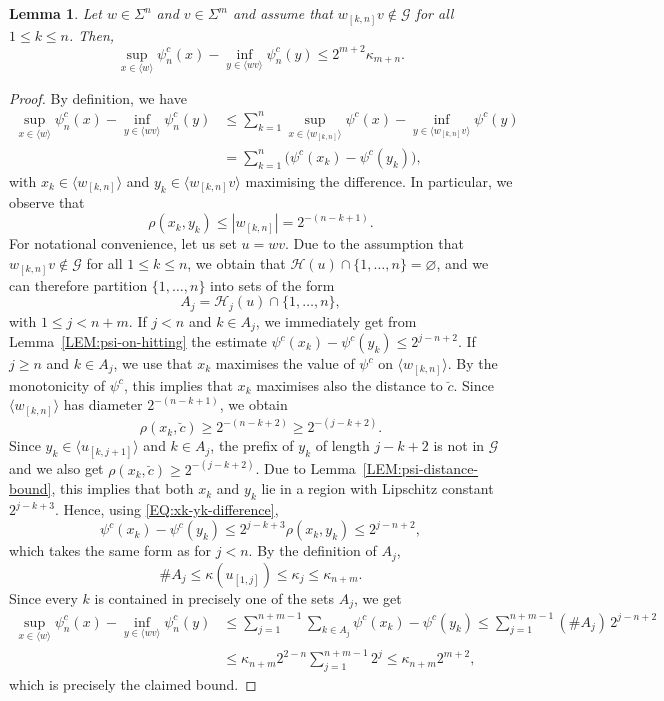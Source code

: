 \documentclass[11pt,reqno]{amsart}
\theoremstyle{plain}
\newtheorem{lemma}[theorem]{Lemma}
\theoremstyle{definition}
\newcommand{\mc}{\mathcal}
\renewcommand{\emptyset}{\varnothing}
\begin{document}
\begin{lemma}
\label{LEM:inf-sup-relation}
Let $w \in \Sigma^n$ and $v \in \Sigma^m$ and assume that $w_{[k,n]} v \notin \mc G$ for all $1\leqslant k \leqslant n$. Then,
\[
\sup_{x \in \langle w \rangle} \psi^c_n(x) - \inf_{y \in \langle wv\rangle} \psi^c_n(y) \leqslant 2^{m+2} \kappa_{m+n}.
\]
\end{lemma}

\begin{proof}
By definition, we have
\begin{align*}
\sup_{x \in \langle w \rangle} \psi^c_n(x) - \inf_{y \in \langle wv\rangle} \psi^c_n(y)
& \leqslant \sum_{k=1}^n \sup_{x \in \langle w_{[k,n]}\rangle} \psi^c(x) - \inf_{y \in \langle w_{[k,n]} v\rangle} \psi^c(y)
\\& = \sum_{k=1}^n \bigl(\psi^c(x_k) - \psi^c(y_k) \bigr),
\end{align*}
with $x_k \in \langle w_{[k,n]}\rangle$ and $y_k \in \langle w_{[k,n]}v\rangle$ maximising the difference. In particular, we observe that
\begin{equation}
\label{EQ:xk-yk-difference}
\rho(x_k,y_k) \leqslant |w_{[k,n]}| = 2^{-(n-k+1)}.
\end{equation}
For notational convenience, let us set $u = wv$.
Due to the assumption that $w_{[k,n]}v \notin \mc G$ for all $1\leqslant k \leqslant n$, we obtain that $\mc H(u)\cap \{1,\ldots,n\} = \emptyset$, and we can therefore partition $\{1,\ldots,n\}$ into sets of the form
\[
A_j = \mc H_j(u) \cap \{1,\ldots,n\},
\]
with $1\leqslant j < n+m$. If $j < n$ and $k \in A_j$, we immediately get from Lemma~\ref{LEM:psi-on-hitting} the estimate $\psi^c(x_k) - \psi^c(y_k) \leqslant 2^{j-n+2}$.
If $j \geqslant n$ and $k \in A_j$, we use that $x_k$ maximises the value of $\psi^c$ on $\langle w_{[k,n]}\rangle$. By the monotonicity of $\psi^c$, this implies that $x_k$ maximises also the distance to $\breve{c}$. Since $\langle w_{[k,n]}\rangle$ has diameter $2^{-(n-k + 1)}$, we obtain
\[
\rho(x_k,\breve{c}) \geqslant 2^{-(n - k +2)} \geqslant 2^{-(j-k+2)}.
\]
Since $y_k \in \langle u_{[k,j + 1]}\rangle$ and $k \in A_j$, the prefix of $y_k$ of length $j - k+2$
is not in $\mc G$ and we also get $\rho(x_k,\breve{c}) \geqslant 2^{-(j-k+2)} $. Due to Lemma~\ref{LEM:psi-distance-bound}, this implies that both $x_k$ and $y_k$ lie in a region with Lipschitz constant  $2^{j - k + 3}$.
Hence, using \eqref{EQ:xk-yk-difference},
\[
\psi^c(x_k) - \psi^c(y_k)
\leqslant 2^{j - k + 3} \rho(x_k,y_k) \leqslant 2^{j - n + 2},
\]
which takes the same form as for $j<n$.
By the definition of $A_j$,
\[
\# A_j \leqslant \kappa(u_{[1,j]}) \leqslant \kappa_j \leqslant \kappa_{n+m}.
\]
Since every $k$ is contained in precisely one of the sets $A_j$, we get
\begin{align*}
\sup_{x \in \langle w \rangle} \psi^c_n(x) - \inf_{y \in \langle wv\rangle} \psi^c_n(y) 
&\leqslant \sum_{j=1}^{n+m-1} \sum_{k \in A_j} \psi^c(x_k) - \psi^c(y_k)
 \leqslant \sum_{j=1}^{n+m-1} (\# A_j)\, 2^{j-n+2} 
\\ &\leqslant \kappa_{n+m} 2^{2-n} \sum_{j=1}^{n+m-1} 2^j
\leqslant \kappa_{n+m} 2^{m+2},
\end{align*}
which is precisely the claimed bound.
\end{proof}
\end{document}
